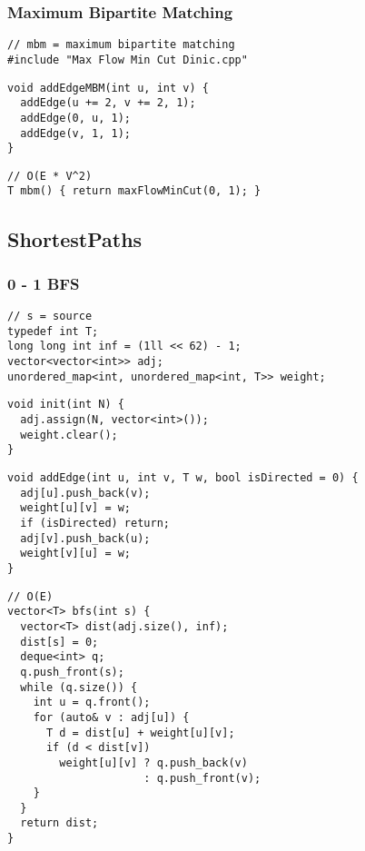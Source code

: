 \documentclass[twoside]{article}
\begin{document}
\begin{multicols*}{2}
\subsubsectionfont{\large\bfseries\sffamily\underline}
\subsubsection*{Maximum Bipartite Matching}
\begin{verbatim}
// mbm = maximum bipartite matching
#include "Max Flow Min Cut Dinic.cpp"
\end{verbatim}
\vspace{-12pt}
\begin{verbatim}
void addEdgeMBM(int u, int v) {
  addEdge(u += 2, v += 2, 1);
  addEdge(0, u, 1);
  addEdge(v, 1, 1);
}
\end{verbatim}
\vspace{-12pt}
\begin{verbatim}
// O(E * V^2)
T mbm() { return maxFlowMinCut(0, 1); }
\end{verbatim}

\subsectionfont{\bfseries\sffamily\centering\LARGE}
\vspace{0em}
\subsection*{ShortestPaths}
\vspace{2em}
\subsubsectionfont{\large\bfseries\sffamily\underline}
\subsubsection*{0 - 1 BFS}
\begin{verbatim}
// s = source
typedef int T;
long long int inf = (1ll << 62) - 1;
vector<vector<int>> adj;
unordered_map<int, unordered_map<int, T>> weight;
\end{verbatim}
\vspace{-12pt}
\begin{verbatim}
void init(int N) {
  adj.assign(N, vector<int>());
  weight.clear();
}
\end{verbatim}
\vspace{-12pt}
\begin{verbatim}
void addEdge(int u, int v, T w, bool isDirected = 0) {
  adj[u].push_back(v);
  weight[u][v] = w;
  if (isDirected) return;
  adj[v].push_back(u);
  weight[v][u] = w;
}
\end{verbatim}
\vspace{-12pt}
\begin{verbatim}
// O(E)
vector<T> bfs(int s) {
  vector<T> dist(adj.size(), inf);
  dist[s] = 0;
  deque<int> q;
  q.push_front(s);
  while (q.size()) {
    int u = q.front();
    for (auto& v : adj[u]) {
      T d = dist[u] + weight[u][v];
      if (d < dist[v])
        weight[u][v] ? q.push_back(v)
                     : q.push_front(v);
    }
  }
  return dist;
}
\end{verbatim}


\end{multicols*}
\end{document}
